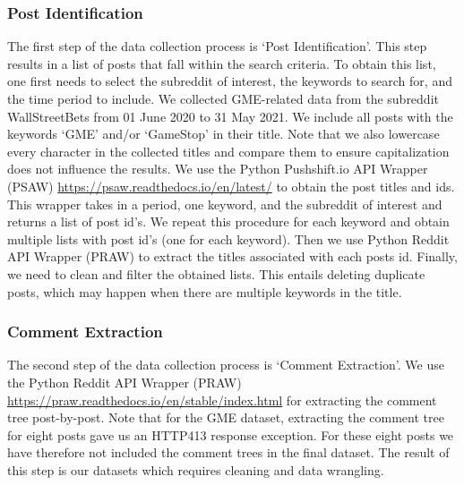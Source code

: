 \subsubsection*{Post Identification}
The first step of the data collection process is `Post Identification'. This step results in a list of posts that fall within the search criteria. To obtain this list, one first needs to select the subreddit of interest, the keywords to search for, and the time period to include. We collected GME-related data from the subreddit WallStreetBets from 01 June 2020 to 31 May 2021. We include all posts with the keywords `GME’ and/or `GameStop’ in their title. Note that we also lowercase every character in the collected titles and compare them to ensure capitalization does not influence the results. We use the Python Pushshift.io API Wrapper (PSAW) \cite{PSAW} \hyperlink{Python Pushshift.io API Wrapper (PSAW)}{https://psaw.readthedocs.io/en/latest/} to obtain the post titles and ids.  This wrapper takes in a period, one keyword, and the subreddit of interest and returns a list of post id's. We repeat this procedure for each keyword and obtain multiple lists with post id's (one for each keyword). %
Then we use Python Reddit API Wrapper (PRAW) to extract the titles associated with each posts id. Finally, we need to clean and filter the obtained lists. This entails deleting duplicate posts, which may happen when there are multiple keywords in the title. %

\subsubsection*{Comment Extraction}
The second step of the data collection process is `Comment Extraction'. We use the Python Reddit API Wrapper (PRAW) \hyperlink{PRAW}{https://praw.readthedocs.io/en/stable/index.html} for extracting the comment tree post-by-post. Note that for the GME dataset, extracting the comment tree for eight posts gave us an HTTP413 response exception. %
For these eight posts we have therefore not included the comment trees in the final dataset. The result of this step is our datasets which requires cleaning and data wrangling.

